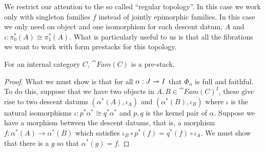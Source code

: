 We restrict our attention to the so called ``regular topology''. In
this case we work only with singleton families $f$ instead of jointly
epimorphic families. In this case we only need on object and one
isomorphism for each descent datum, $A$ and
$\iota : \pi_0^*(A) \cong \pi_1^*(A)$. What is particularly useful to
us is that all the fibrations we want to work with form prestacks for
this topology.
\begin{thm}
  For an internal category $C$, $\cat{Fam}(C)$ is a pre-stack.
\end{thm}
\begin{proof}
  What we must show is that for all $\alpha : J \twoheadrightarrow I$ that
  $\Phi_\alpha$ is full and faithful. To do this, suppose that we have
  two objects in $A, B \in \cat{Fam}(C)^I$, these give rise to two
  descent datums $(\alpha^*(A), \iota_A)$ and $(\alpha^*(B), \iota_B)$
  where $\iota$ is the natural isomorphisms
  $\iota : p^*\alpha^* \cong q^*\alpha^*$ and $p, q$ is the kernel
  pair of $\alpha$. Suppose we have a morphism between the descent
  datums, that is, a morphism $f : \alpha^*(A) \to \alpha^*(B)$ which
  satisfies $\iota_B \circ p^*(f) = q^*(f) \circ \iota_A$. We must
  show that there is a $g$ so that $\alpha^*(g) = f$.


\end{proof}

